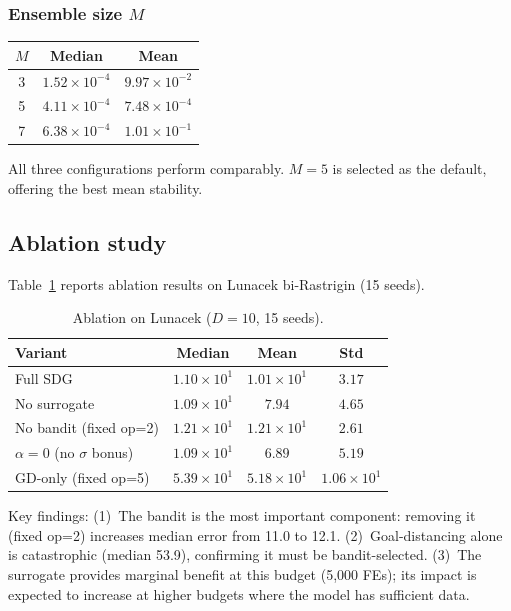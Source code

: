 \documentclass[preprint,12pt,authoryear]{elsarticle}
\begin{document}
\subsubsection{Ensemble size $M$}

\begin{center}
\begin{tabular}{ccc}
\toprule
$M$ & Median & Mean \\
\midrule
3 & $1.52 \times 10^{-4}$ & $9.97 \times 10^{-2}$ \\
5 & $4.11 \times 10^{-4}$ & $7.48 \times 10^{-4}$ \\
7 & $6.38 \times 10^{-4}$ & $1.01 \times 10^{-1}$ \\
\bottomrule
\end{tabular}
\end{center}

All three configurations perform comparably. $M = 5$ is selected as the default, offering the best mean stability.

\subsection{Ablation study}

Table~\ref{tab:ablation} reports ablation results on Lunacek bi-Rastrigin (15 seeds).

\begin{table}[h]
\centering
\caption{Ablation on Lunacek ($D = 10$, 15 seeds).}
\label{tab:ablation}
\begin{tabular}{lccc}
\toprule
Variant & Median & Mean & Std \\
\midrule
Full SDG & $1.10 \times 10^{1}$ & $1.01 \times 10^{1}$ & $3.17$ \\
No surrogate & $1.09 \times 10^{1}$ & $7.94$ & $4.65$ \\
No bandit (fixed op=2) & $1.21 \times 10^{1}$ & $1.21 \times 10^{1}$ & $2.61$ \\
$\alpha = 0$ (no $\sigma$ bonus) & $1.09 \times 10^{1}$ & $6.89$ & $5.19$ \\
GD-only (fixed op=5) & $5.39 \times 10^{1}$ & $5.18 \times 10^{1}$ & $1.06 \times 10^{1}$ \\
\bottomrule
\end{tabular}
\end{table}

Key findings: (1)~The bandit is the most important component: removing it (fixed op=2) increases median error from 11.0 to 12.1. (2)~Goal-distancing alone is catastrophic (median 53.9), confirming it must be bandit-selected. (3)~The surrogate provides marginal benefit at this budget (5{,}000 FEs); its impact is expected to increase at higher budgets where the model has sufficient data.
\end{document}
